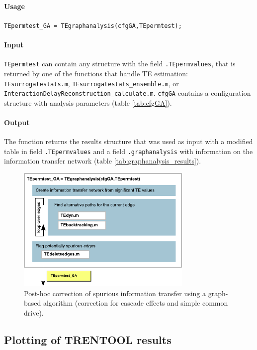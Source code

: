 \documentclass[a4paper,10pt]{article}
\begin{document}
\paragraph*{Usage} \verb&TEpermtest_GA = TEgraphanalysis(cfgGA,TEpermtest);&

\paragraph*{Input} \texttt{TEpermtest} can contain any structure with the field \verb&.TEpermvalues&, that is returned by one of the functions that handle TE estimation: \verb&TEsurrogatestats.m&, \verb&TEsurrogatestats_ensemble.m&, or \verb&InteractionDelayReconstruction_calculate.m&. \verb&cfgGA& contains a configuration structure with analysis parameters (table \ref{tab:cfgGA}).

\paragraph*{Output} The function returns the results structure that was used as input with a modified table in field \verb&.TEpermvalues& and a field \verb&.graphanalysis& with information on the information transfer network (table \ref{tab:graphanalysis_results}). 

\begin{figure}[H]	
	\centering 
 		\includegraphics[width=0.75\textwidth]{figures/TRENTOOL3_graphanalysis.pdf}
	\caption[Graph based correction of spurious information transfer]{Post-hoc correction of spurious information transfer using a graph-based algorithm (correction for cascade effects and simple common drive).}
	\label{fig:graphanalysis}
\end{figure} 


\subsection{Plotting of TRENTOOL results}
\end{document}
